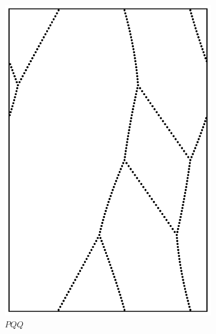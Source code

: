 \documentclass[12pt,twoside]{reedthesis}
\theoremstyle{definition}
\begin{document}
\begin{figure}[h]
\begin{subfigure}[t]{0.24\textwidth}
    \includegraphics[width=\textwidth]{figures/string_cheese_appendix/pqq.pdf}
    \caption*{$PQQ$}
    \vspace{5mm}
  \end{subfigure}
  \hfill
  \begin{subfigure}[t]{0.24\textwidth}

\end{subfigure}
\end{figure}
\end{document}
